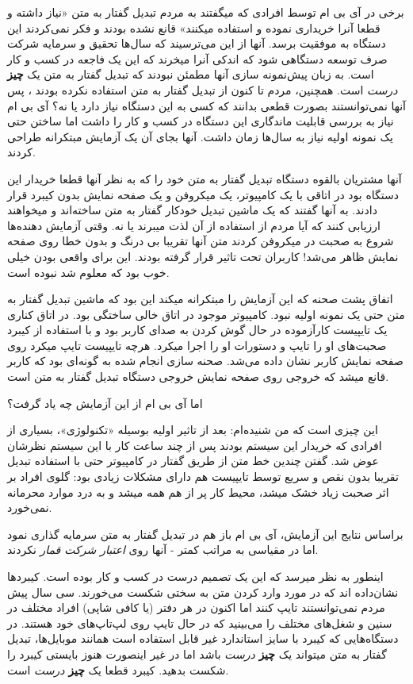 برخی در آی بی ام توسط افرادی که میگفتند به مردم تبدیل گفتار به متن «نیاز
داشته و قطعا آنرا خریداری نموده و استفاده میکنند» قانع نشده بودند و فکر
نمی‌کردند این دستگاه به موفقیت برسد. آنها از این می‌ترسیند که سال‌ها
تحقیق و سرمایه شرکت صرف توسعه دستگاهی شود که اندکی آنرا میخرند که این یک
فاجعه در کسب و کار است. به زبان پیش‌نمونه سازی آنها مطمئن نبودند که
تبدیل گفتار به متن یک \textbf{چیز} \emph{درست} است. همچنین، مردم تا کنون
از تبدیل گفتار به متن استفاده نکرده بودند ، پس آنها نمی‌توانستند بصورت
قطعی بدانند که کسی به این دستگاه نیاز دارد یا نه؟ آی بی ام نیاز به بررسی
قابلیت ماندگاری این دستگاه در کسب و کار را داشت اما ساختن حتی یک نمونه
اولیه نیاز به سال‌ها زمان داشت. آنها بجای آن یک آزمایش مبتکرانه طراحی
کردند.

آنها مشتریان بالقوه دستگاه تبدیل گفتار به متن خود را که به نظر آنها قطعا
خریدار این دستگاه بود در اتاقی با یک کامپیوتر، یک میکروفن و یک صفحه
نمایش بدون کیبرد قرار دادند. به آنها گفتند که یک ماشین تبدیل خودکار
گفتار به متن ساخته‌اند و میخواهند ارزیابی کنند که آیا مردم از استفاده از
آن لذت میبرند یا نه. وقتی آزمایش دهنده‌ها شروع به صحبت در میکروفن کردند
متن آنها تقریبا بی درنگ و بدون خطا روی صفحه نمایش ظاهر می‌شد! کاربران
تحت تاثیر قرار گرفته بودند. این برای واقعی بودن خیلی خوب بود که معلوم شد
نبوده است.

اتفاق پشت صحنه که این آزمایش را مبتکرانه میکند این بود که ماشین تبدیل
گفتار به متن حتی یک نمونه اولیه نبود. کامپیوتر موجود در اتاق خالی ساختگی
بود. در اتاق کناری یک تایپیست کارآزموده در حال گوش کردن به صدای کاربر
بود و با استفاده از کیبرد صحبت‌های او را تایپ و دستورات او را اجرا
میکرد. هرچه تایپیست تایپ میکرد روی صفحه نمایش کاربر نشان داده می‌شد.
صحنه سازی انجام شده به گونه‌ای بود که کاربر قانع میشد که خروجی روی صفحه
نمایش خروجی دستگاه تبدیل گفتار به متن است.

اما آی بی ام از این آزمایش چه یاد گرفت؟

این چیزی است که من شنیده‌ام: بعد از تاثیر اولیه بوسیله «تکنولوژی»،
بسیاری از افرادی که خریدار این سیستم بودند پس از چند ساعت کار با این
سیستم نظرشان عوض شد. گفتن چندین خط متن از طریق گفتار در کامپیوتر حتی با
استفاده تبدیل تقریبا بدون نقص و سریع توسط تایپیست هم دارای مشکلات زیادی
بود: گلوی افراد بر اثر صحبت زیاد خشک میشد، محیط کار پر از هم همه میشد و
به درد موارد محرمانه نمی‌خورد.

براساس نتایج این آزمایش، آی بی ام باز هم در تبدیل گفتار به متن سرمایه
گذاری نمود اما در مقیاسی به مراتب کمتر - آنها روی \emph{اعتبار شرکت
قمار} نکردند.

اینطور به نظر میرسد که این یک تصمیم درست در کسب و کار بوده است. کیبردها
نشان‌داده اند که در مورد وارد کردن متن به سختی شکست می‌خورند. سی سال پیش
مردم نمی‌توانستند تایپ کنند اما اکنون در هر دفتر (یا کافی شاپی) افراد
مختلف در سنین و شغل‌های مختلف را می‌بینید که در حال تایپ روی لپ‌تاپ‌های
خود هستند. در دستگاه‌هایی که کیبرد با سایز استاندارد غیر قابل استفاده
است همانند موبایل‌ها، تبدیل گفتار به متن میتواند یک \textbf{چیز}
\emph{درست} باشد اما در غیر اینصورت هنوز بایستی کیبرد را شکست بدهید.
کیبرد قطعا یک \textbf{چیز} \emph{درست} است.

